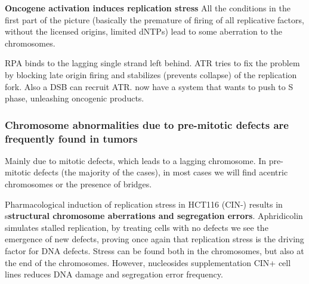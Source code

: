 \textbf{Oncogene activation induces replication stress} All the
conditions in the first part of the picture (basically the premature of
firing of all replicative factors, without the licensed origins, limited
dNTPs) lead to some aberration to the chromosomes.

RPA binds to the lagging single strand left behind.  ATR tries to fix
the problem by blocking late origin firing and stabilizes (prevents
collapse) of the replication fork. Also a DSB can recruit ATR.
now have a system that wants to push to S phase, unleashing oncogenic
products.

\hypertarget{chromosome-abnormalities-due-to-pre-mitotic-defects-are-frequently-found-in-tumors}{%
\subsubsection{Chromosome abnormalities due to pre-mitotic defects are
frequently found in
tumors}\label{chromosome-abnormalities-due-to-pre-mitotic-defects-are-frequently-found-in-tumors}}

Mainly due to mitotic defects, which leads to a lagging chromosome. In
pre-mitotic defects (the majority of the cases), in most cases we will
find acentric chromosomes or the presence of bridges.

Pharmacological induction of replication stress in HCT116 (CIN-) results
in s\textbf{structural chromosome aberrations and segregation errors}.
Aphridicolin simulates stalled replication, by treating cells with no
defects we see the emergence of new defects, proving once again that
replication stress is the driving factor for DNA defects. Stress can be
found both in the chromosomes, but also at the end of the chromosomes.
However, nucleosides supplementation CIN+ cell lines reduces DNA damage
and segregation error frequency.

